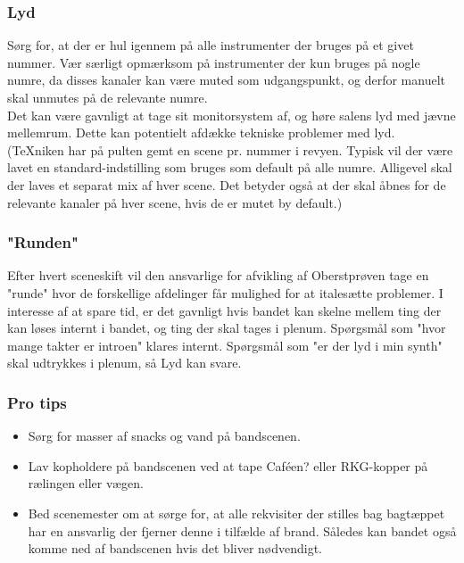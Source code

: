 \subsubsection{Lyd}
Sørg for, at der er hul igennem på alle instrumenter der bruges på et givet nummer. Vær særligt opmærksom på instrumenter der kun bruges på nogle numre, da disses kanaler kan være muted som udgangspunkt, og derfor manuelt skal unmutes på de relevante numre.\\
Det kan være gavnligt at tage sit monitorsystem af, og høre salens lyd med jævne mellemrum. Dette kan potentielt afdække tekniske problemer med lyd.\\
(TeXniken har på pulten gemt en scene pr. nummer i revyen. Typisk vil der være lavet en standard-indstilling som bruges som default på alle numre. Alligevel skal der laves et separat mix af hver scene. Det betyder også at der skal åbnes for de relevante kanaler på hver scene, hvis de er mutet by default.)

\subsubsection{"Runden"}
Efter hvert sceneskift vil den ansvarlige for afvikling af Oberstprøven tage en "runde" hvor de forskellige afdelinger får mulighed for at italesætte problemer. I interesse af at spare tid, er det gavnligt hvis bandet kan skelne mellem ting der kan løses internt i bandet, og ting der skal tages i plenum. Spørgsmål som "hvor mange takter er introen" klares internt. Spørgsmål som "er der lyd i min synth" skal udtrykkes i plenum, så Lyd kan svare.

\subsubsection{Pro tips}
\begin{itemize}
    \item Sørg for masser af snacks og vand på bandscenen.
    \item Lav kopholdere på bandscenen ved at tape Caféen? eller RKG-kopper på rælingen eller vægen.
    \item Bed scenemester om at sørge for, at alle rekvisiter der stilles bag bagtæppet har en ansvarlig der fjerner denne i tilfælde af brand. Således kan bandet også komme ned af bandscenen hvis det bliver nødvendigt.
\end{itemize}
